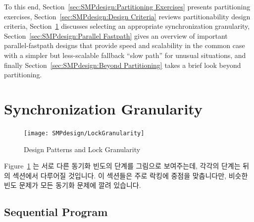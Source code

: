 To this end, Section~\ref{sec:SMPdesign:Partitioning Exercises}
presents partitioning exercises,
Section~\ref{sec:SMPdesign:Design Criteria} reviews partitionability
design criteria,
Section~\ref{sec:SMPdesign:Synchronization Granularity}
discusses selecting an appropriate synchronization granularity,
Section~\ref{sec:SMPdesign:Parallel Fastpath}
gives an overview of important parallel-fastpath designs
that provide speed and scalability in the common case with
a simpler but less-scalable fallback ``slow path'' for unusual
situations,
and finally
Section~\ref{sec:SMPdesign:Beyond Partitioning}
takes a brief look beyond partitioning.
\fi





\section{Synchronization Granularity}
\label{sec:SMPdesign:Synchronization Granularity}

\begin{figure}[tb]
\begin{center}
\texttt{[image: SMPdesign/LockGranularity]}
\end{center}
\caption{Design Patterns and Lock Granularity}
\label{fig:SMPdesign:Design Patterns and Lock Granularity}
\end{figure}

Figure~\ref{fig:SMPdesign:Design Patterns and Lock Granularity} 는 서로 다른
동기화 빈도의 단계를 그림으로 보여주는데, 각각의 단계는 뒤의 섹션에서 다루어질
것입니다.
이 섹션들은 주로 락킹에 중점을 맞춥니다만, 비슷한 빈도 문제가 모든 동기화
문제에 깔려 있습니다.

\subsection{Sequential Program}
\label{sec:SMPdesign:Sequential Program}

